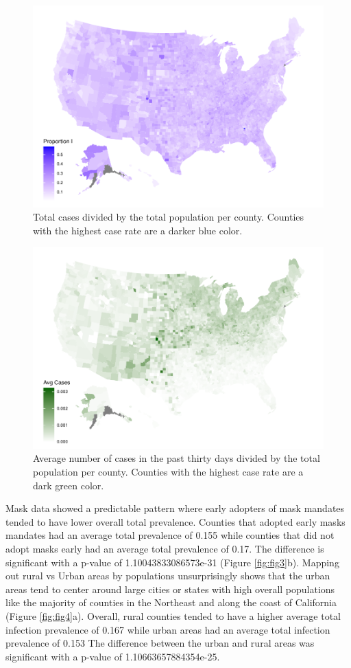 \documentclass[
  12pt,
]{article}
\begin{document}
\begin{figure}[H]

{\centering \includegraphics[width=0.7\linewidth,]{Final-Manuscript_files/figure-latex/fig1-1} 

}

\caption{Total cases divided by the total population per county. Counties with the highest case rate are a darker blue color.}\label{fig:fig1}
\end{figure}



\begin{figure}[H]

{\centering \includegraphics[width=0.7\linewidth,]{Final-Manuscript_files/figure-latex/fig2-1} 

}

\caption{Average number of cases in the past thirty days divided by the total population per county. Counties with the highest case rate are a dark green color.}\label{fig:fig2}
\end{figure}

Mask data showed a predictable pattern where early adopters of mask mandates tended to have lower overall total prevalence. Counties that adopted early masks mandates had an average total prevalence of 0.155 while counties that did not adopt masks early had an average total prevalence of 0.17. The difference is significant with a p-value of 1.10043833086573e-31 (Figure \ref{fig:fig3}b). Mapping out rural vs Urban areas by populations unsurprisingly shows that the urban areas tend to center around large cities or states with high overall populations like the majority of counties in the Northeast and along the coast of California (Figure \ref{fig:fig4}a). Overall, rural counties tended to have a higher average total infection prevalence of 0.167 while urban areas had an average total infection prevalence of 0.153 The difference between the urban and rural areas was significant with a p-value of 1.10663657884354e-25.
\end{document}
